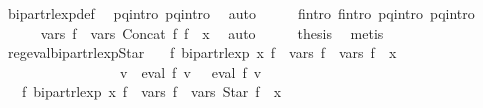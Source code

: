 \begin{isabellebody}
\ bipart{\isacharunderscore}{\kern0pt}rlexp{\isacharunderscore}{\kern0pt}def\ \isamarkupfalse%
\ p{}{\isacharunderscore}{\kern0pt}q{}{\isacharunderscore}{\kern0pt}intro\ p{}{\isacharunderscore}{\kern0pt}q{}{\isacharunderscore}{\kern0pt}intro\ \isamarkupfalse%
\ auto\isanewline
\ \ \isamarkupfalse%
\ \isamarkupfalse%
\ f{}{\isacharprime}{\kern0pt}{\isacharunderscore}{\kern0pt}intro\ f{}{\isacharprime}{\kern0pt}{\isacharunderscore}{\kern0pt}intro\ p{}{\isacharunderscore}{\kern0pt}q{}{\isacharunderscore}{\kern0pt}intro\ p{}{\isacharunderscore}{\kern0pt}q{}{\isacharunderscore}{\kern0pt}intro\isanewline
\ \ \ \ \isamarkupfalse%
\ {\isachardoublequoteopen}vars\ {\isacharquery}{\kern0pt}f{\isacharprime}{\kern0pt}\ {\isacharequal}{\kern0pt}\ vars\ {\isacharparenleft}{\kern0pt}Concat\ f{}\ f{}{\isacharparenright}{\kern0pt}\ {\isasymunion}\ {\isacharbraceleft}{\kern0pt}x{\isacharbraceright}{\kern0pt}{\isachardoublequoteclose}\ \isamarkupfalse%
\ auto\isanewline
\ \ \isamarkupfalse%
\ \isamarkupfalse%
\ {\isacharquery}{\kern0pt}thesis\ \isamarkupfalse%
\ metis\isanewline
{}\isamarkupfalse%
%
\endisatagproof
{\isafoldproof}%
%
\isadelimproof
\isanewline
%
\endisadelimproof
\isanewline
{}\isamarkupfalse%
\ reg{\isacharunderscore}{\kern0pt}eval{\isacharunderscore}{\kern0pt}bipart{\isacharunderscore}{\kern0pt}rlexp{\isacharunderscore}{\kern0pt}Star{\isacharcolon}{\kern0pt}\isanewline
\ \ \ {\isachardoublequoteopen}{\isasymexists}f{\isacharprime}{\kern0pt}{\isachardot}{\kern0pt}\ bipart{\isacharunderscore}{\kern0pt}rlexp\ x\ f{\isacharprime}{\kern0pt}\ {\isasymand}\ vars\ f{\isacharprime}{\kern0pt}\ {\isacharequal}{\kern0pt}\ vars\ f\ {\isasymunion}\ {\isacharbraceleft}{\kern0pt}x{\isacharbraceright}{\kern0pt}\isanewline
\ \ \ \ \ \ \ \ \ \ \ \ \ \ \ \ {\isasymand}\ {\isacharparenleft}{\kern0pt}{\isasymforall}v{\isachardot}{\kern0pt}\ {\isasymPsi}\ {\isacharparenleft}{\kern0pt}eval\ f\ v{\isacharparenright}{\kern0pt}\ {\isacharequal}{\kern0pt}\ {\isasymPsi}\ {\isacharparenleft}{\kern0pt}eval\ f{\isacharprime}{\kern0pt}\ v{\isacharparenright}{\kern0pt}{\isacharparenright}{\kern0pt}{\isachardoublequoteclose}\isanewline
\ \ \ {\isachardoublequoteopen}{\isasymexists}f{\isacharprime}{\kern0pt}{\isachardot}{\kern0pt}\ bipart{\isacharunderscore}{\kern0pt}rlexp\ x\ f{\isacharprime}{\kern0pt}\ {\isasymand}\ vars\ f{\isacharprime}{\kern0pt}\ {\isacharequal}{\kern0pt}\ vars\ {\isacharparenleft}{\kern0pt}Star\ f{\isacharparenright}{\kern0pt}\ {\isasymunion}\ {\isacharbraceleft}{\kern0pt}x{\isacharbraceright}{\kern0pt}\isanewline

\end{isabellebody}
